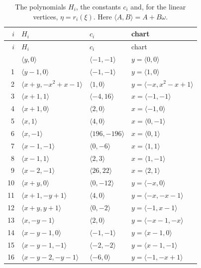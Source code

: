 \documentclass[11pt]{article}
\begin{document}
\clearpage
\begingroup\small
\setlength{\LTcapwidth}{\textwidth}
\begin{longtable}{@{}rlll@{}}
\caption{The polynomials $H_i$, the constants $c_i$ and, for the linear vertices, $\eta=r_i(\xi)$. Here $\langle A,B\rangle=A+B\omega$.}\label{tab:vert1}\\
\hline $i$ & $H_i$ & $c_i$ & chart\\\hline\endfirsthead\hline $i$ & $H_i$ & $c_i$ & chart\\\hline\endhead\hline\endfoot
0 & $\langle y,0\rangle$ & $\langle -1,-1\rangle$ & $y=\langle 0,0\rangle$\\
1 & $\langle y-1,0\rangle$ & $\langle -1,-1\rangle$ & $y=\langle 1,0\rangle$\\
2 & $\langle x+y,-x^{2}+x-1\rangle$ & $\langle 1,0\rangle$ & $y=\langle -x,x^{2}-x+1\rangle$\\
3 & $\langle x+1,1\rangle$ & $\langle -4,16\rangle$ & $x=\langle -1,-1\rangle$\\
4 & $\langle x+1,0\rangle$ & $\langle 2,0\rangle$ & $x=\langle -1,0\rangle$\\
5 & $\langle x,1\rangle$ & $\langle 4,0\rangle$ & $x=\langle 0,-1\rangle$\\
6 & $\langle x,-1\rangle$ & $\langle 196,-196\rangle$ & $x=\langle 0,1\rangle$\\
7 & $\langle x-1,-1\rangle$ & $\langle 0,-6\rangle$ & $x=\langle 1,1\rangle$\\
8 & $\langle x-1,1\rangle$ & $\langle 2,3\rangle$ & $x=\langle 1,-1\rangle$\\
9 & $\langle x-2,-1\rangle$ & $\langle 26,22\rangle$ & $x=\langle 2,1\rangle$\\
10 & $\langle x+y,0\rangle$ & $\langle 0,-12\rangle$ & $y=\langle -x,0\rangle$\\
11 & $\langle x+1,-y+1\rangle$ & $\langle 4,0\rangle$ & $y=\langle -x,-x-1\rangle$\\
12 & $\langle x+y,y+1\rangle$ & $\langle 0,-2\rangle$ & $y=\langle -1,x-1\rangle$\\
13 & $\langle x,-y-1\rangle$ & $\langle 2,0\rangle$ & $y=\langle -x-1,-x\rangle$\\
14 & $\langle x-y-1,0\rangle$ & $\langle -1,-1\rangle$ & $y=\langle x-1,0\rangle$\\
15 & $\langle x-y-1,-1\rangle$ & $\langle -2,-2\rangle$ & $y=\langle x-1,-1\rangle$\\
16 & $\langle x-y-2,-y-1\rangle$ & $\langle -6,0\rangle$ & $y=\langle -1,-x+1\rangle$\\

\end{longtable}
\end{document}

